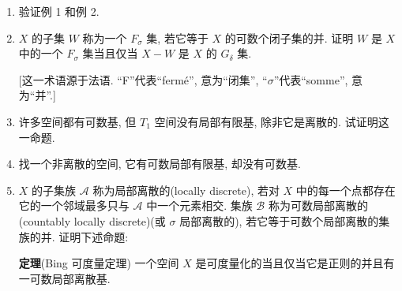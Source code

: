 \documentclass[../../main.tex]{subfiles}
\begin{document}
\begin{enumerate}
\item 验证例 1 和例 2.
\item $X$ 的子集 $W$ 称为一个 $F_\sigma$ 集, 若它等于 $X$ 的可数个闭子集的并. 证明 $W$ 是 $X$ 中的一个 $F_\sigma$ 集当且仅当 $X-W$ 是 $X$ 的 $G_\delta$ 集.

[这一术语源于法语. ``F''代表``fermé'', 意为``闭集'', ``$\sigma$''代表``somme'', 意为``并''.]
\item 许多空间都有可数基, 但 $T_1$ 空间没有局部有限基, 除非它是离散的. 试证明这一命题.
\item 找一个非离散的空间, 它有可数局部有限基, 却没有可数基.
\item $X$ 的子集族 $\mathcal{A}$ 称为局部离散的(locally discrete), 若对 $X$ 中的每一个点都存在它的一个邻域最多只与 $\mathcal{A}$ 中一个元素相交. 集族 $\mathcal{B}$ 称为可数局部离散的(countably locally discrete)(或 $\sigma$ 局部离散的), 若它等于可数个局部离散的集族的并. 证明下述命题:

\textbf{定理}(Bing 可度量定理) 一个空间 $X$ 是可度量化的当且仅当它是正则的并且有一可数局部离散基.
\end{enumerate}
\end{document}
